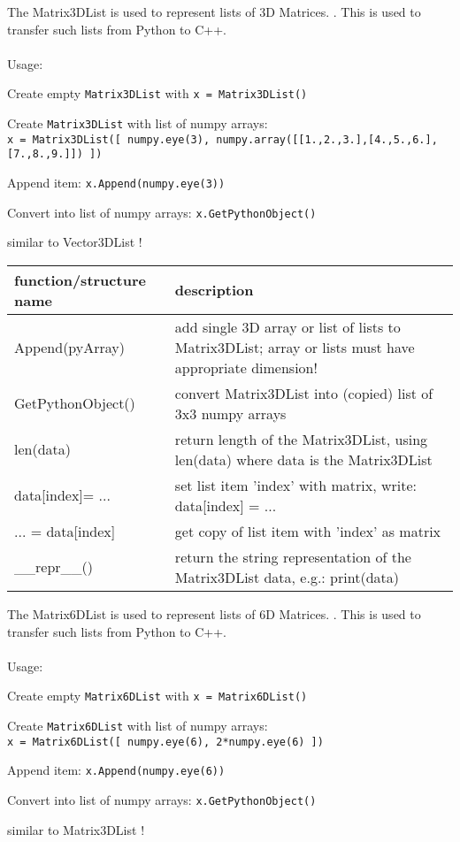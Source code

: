 The Matrix3DList is used to represent lists of 3D Matrices. . This is used to transfer such lists from Python to C++. \\ \\ Usage: \bi
  \item Create empty \texttt{Matrix3DList} with \texttt{x = Matrix3DList()} 
  \item Create \texttt{Matrix3DList} with list of numpy arrays:\\\texttt{x = Matrix3DList([ numpy.eye(3), numpy.array([[1.,2.,3.],[4.,5.,6.],[7.,8.,9.]]) ])}
  \item Append item: \texttt{x.Append(numpy.eye(3))}
  \item Convert into list of numpy arrays: \texttt{x.GetPythonObject()}
  \item similar to Vector3DList !
\ei


\begin{center}
\footnotesize
\begin{longtable}{| p{8cm} | p{8cm} |} 
\hline
{\bf function/structure name} & {\bf description}\\ \hline
  Append(pyArray) & add single 3D array or list of lists to Matrix3DList; array or lists must have appropriate dimension!\\ \hline 
  GetPythonObject() & convert Matrix3DList into (copied) list of 3x3 numpy arrays\\ \hline 
  len(data) & return length of the Matrix3DList, using len(data) where data is the Matrix3DList\\ \hline 
  data[index]= ... & set list item 'index' with matrix, write: data[index] = ...\\ \hline 
  ... = data[index] & get copy of list item with 'index' as matrix\\ \hline 
  \_\_repr\_\_() & return the string representation of the Matrix3DList data, e.g.: print(data)\\ \hline 
\end{longtable}
\end{center}

The Matrix6DList is used to represent lists of 6D Matrices. . This is used to transfer such lists from Python to C++. \\ \\ Usage: \bi
  \item Create empty \texttt{Matrix6DList} with \texttt{x = Matrix6DList()} 
  \item Create \texttt{Matrix6DList} with list of numpy arrays:\\\texttt{x = Matrix6DList([ numpy.eye(6), 2*numpy.eye(6) ])}
  \item Append item: \texttt{x.Append(numpy.eye(6))}
  \item Convert into list of numpy arrays: \texttt{x.GetPythonObject()}
  \item similar to Matrix3DList !
\ei


